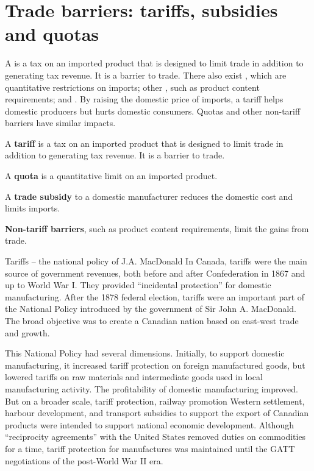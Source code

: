 \section{Trade barriers: tariffs, subsidies and quotas}\label{sec:ch15sec5}

A  is a tax on an imported product that is designed to limit trade in addition to generating tax revenue. It is a barrier to trade. There also exist , which are quantitative restrictions on imports; other , such as product content requirements; and . By raising the domestic price of imports, a tariff helps domestic producers but hurts domestic consumers. Quotas and other non-tariff barriers have similar impacts.

\begin{DefBox}
A \textbf{tariff} is a tax on an imported product that is designed to limit trade in addition to generating tax revenue. It is a barrier to trade.

A \textbf{quota} is a quantitative limit on an imported product.

A \textbf{trade subsidy} to a domestic manufacturer reduces the domestic cost and limits imports.

\textbf{Non-tariff barriers}, such as product content requirements, limit the gains from trade.
\end{DefBox}

\begin{ApplicationBox}{Tariffs -- the national policy of J.A. MacDonald}\label{app:ch15app2}
In Canada, tariffs were the main source of government revenues, both before and after Confederation in 1867 and up to World War I. They provided “incidental protection” for domestic manufacturing. After the 1878 federal election, tariffs were an important part of the National Policy introduced by the government of Sir John A. MacDonald. The broad objective was to create a Canadian nation based on east-west trade and growth.

\bigskip
This National Policy had several dimensions. Initially, to support domestic manufacturing, it increased tariff protection on foreign manufactured goods, but lowered tariffs on raw materials and intermediate goods used in local manufacturing activity. The profitability of domestic manufacturing improved. But on a broader scale, tariff protection, railway promotion Western settlement, harbour development, and transport subsidies to support the export of Canadian products were intended to support national economic development. Although “reciprocity agreements” with the United States removed duties on commodities for a time, tariff protection for manufactures was maintained until the GATT negotiations of the post-World War II era. 
\end{ApplicationBox}

